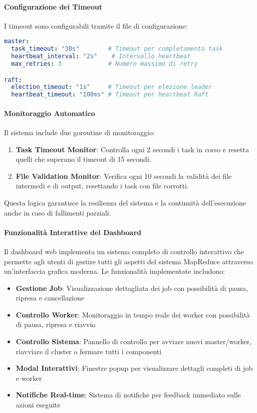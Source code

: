 \documentclass[12pt,a4paper]{article}
\begin{document}
\paragraph{Configurazione dei Timeout}
I timeout sono configurabili tramite il file di configurazione:

\begin{lstlisting}[language=yaml, caption=Configurazione timeout nel file config.yaml]
master:
  task_timeout: "30s"        # Timeout per completamento task
  heartbeat_interval: "2s"    # Intervallo heartbeat
  max_retries: 3             # Numero massimo di retry

raft:
  election_timeout: "1s"     # Timeout per elezione leader
  heartbeat_timeout: "100ms" # Timeout per heartbeat Raft
\end{lstlisting}

\paragraph{Monitoraggio Automatico}
Il sistema include due goroutine di monitoraggio:

\begin{enumerate}
\item \textbf{Task Timeout Monitor}: Controlla ogni 2 secondi i task in corso e resetta quelli che superano il timeout di 15 secondi.

\item \textbf{File Validation Monitor}: Verifica ogni 10 secondi la validità dei file intermedi e di output, resettando i task con file corrotti.
\end{enumerate}

Questa logica garantisce la resilienza del sistema e la continuità dell'esecuzione anche in caso di fallimenti parziali.

\paragraph{Funzionalità Interattive del Dashboard}
Il dashboard web implementa un sistema completo di controllo interattivo che permette agli utenti di gestire tutti gli aspetti del sistema MapReduce attraverso un'interfaccia grafica moderna. Le funzionalità implementate includono:

\begin{itemize}
\item \textbf{Gestione Job}: Visualizzazione dettagliata dei job con possibilità di pausa, ripresa e cancellazione
\item \textbf{Controllo Worker}: Monitoraggio in tempo reale dei worker con possibilità di pausa, ripresa e riavvio
\item \textbf{Controllo Sistema}: Pannello di controllo per avviare nuovi master/worker, riavviare il cluster o fermare tutti i componenti
\item \textbf{Modal Interattivi}: Finestre popup per visualizzare dettagli completi di job e worker
\item \textbf{Notifiche Real-time}: Sistema di notifiche per feedback immediato sulle azioni eseguite
\end{itemize}
\end{document}
